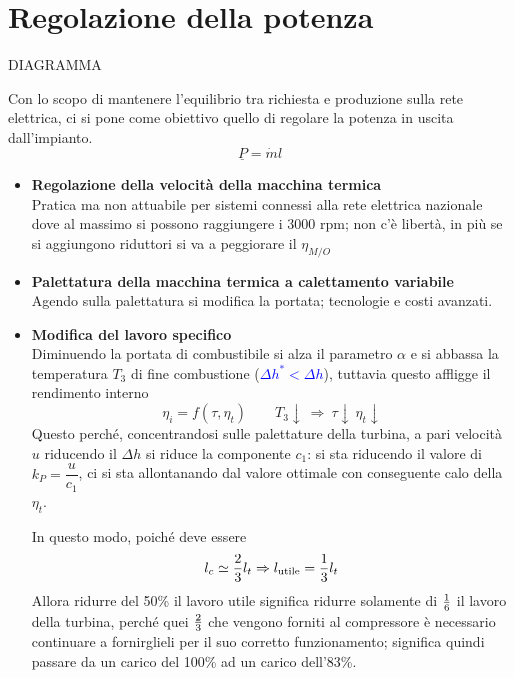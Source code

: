 \section{Regolazione della potenza}
\begin{adjustwidth}{2in}{}	
	
	DIAGRAMMA 
	
	Con lo scopo di mantenere l'equilibrio tra richiesta e produzione sulla rete elettrica, ci si pone come obiettivo quello di regolare la potenza in uscita dall'impianto.
	\[\underline{P} = \dot{m}l\]
	\begin{itemize}
		\item \textbf{Regolazione della velocità della macchina termica}\\
		
		Pratica ma non attuabile per sistemi connessi alla rete elettrica nazionale dove al massimo si possono raggiungere i 3000 rpm; non c'è libertà, in più se si aggiungono riduttori si va a peggiorare il $\eta_{M/O}$
		
		\item \textbf{Palettatura della macchina termica a calettamento variabile}\\
		
		Agendo sulla palettatura si modifica la portata; tecnologie e costi avanzati.
		
		\item \textbf{Modifica del lavoro specifico} \\
		
		Diminuendo la portata di combustibile si alza il parametro $\alpha$ e si abbassa la temperatura $T_3$ di fine combustione (\textcolor{blue}{$\Delta h^*<\Delta h$}), tuttavia questo affligge il rendimento interno
		\[\eta_i = f(\tau, \eta_t)\qquad T_3\downarrow~\Rightarrow~\tau\downarrow~\eta_t\downarrow\]
		Questo perché, concentrandosi sulle palettature della turbina, a pari velocità $u$ riducendo il $\Delta h$ si riduce la componente $c_1$: si sta riducendo il valore di $k_P = \dfrac{u}{c_1}$, ci si sta allontanando dal valore ottimale con conseguente calo della $\eta_t$. 
		
		In questo modo, poiché deve essere 
		\[l_c \simeq {2\over3}l_t\Rightarrow l_{\text{utile}} = {1\over3}l_t\]
		Allora ridurre del 50\% il lavoro utile significa ridurre solamente di ${1\over6}$ il lavoro della turbina, perché quei $2\over3$ che vengono forniti al compressore è necessario continuare a fornirglieli per il suo corretto funzionamento; significa quindi passare da un carico del 100\% ad un carico dell'83\%. 
		
	\end{itemize}
\end{adjustwidth}	


